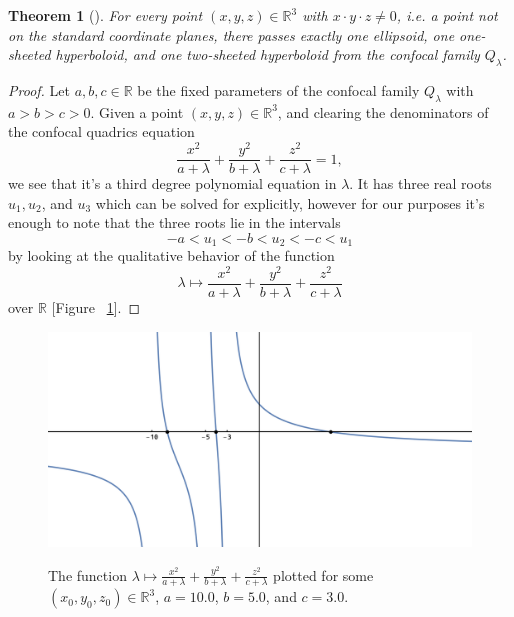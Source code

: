 \documentclass[12pt,a4paper]{article}
\theoremstyle{BoldTopSpacing}
\newtheorem{theorem}{Theorem}[section]
\theoremstyle{BoldTopSpacing}
\theoremstyle{BoldTopSpacing}
\theoremstyle{BoldTopBottomSpacing}
\theoremstyle{BoldTopSpacing}
\theoremstyle{BoldTopBottomSpacing}
\theoremstyle{remark}
\begin{document}
\begin{theorem}[]
\label{thm:fill-up-euclidean-space}
For every point $(x, y, z) \in \mathbb{R}^3$ with $x \cdot y \cdot z \neq 0$, i.e. a point not on the standard coordinate planes, there passes exactly one ellipsoid, one one-sheeted hyperboloid, and one two-sheeted hyperboloid from the confocal family $Q_{\lambda}$.
\end{theorem}

\begin{proof}
    Let $a, b, c \in \mathbb{R}$ be the fixed parameters of the confocal family $Q_{\lambda}$ with $a > b > c > 0$. Given a point $(x, y, z) \in \mathbb{R}^3$, and clearing the denominators of the confocal quadrics equation
\[
    \frac{x^2}{a + \lambda} + \frac{y^2}{b + \lambda} + \frac{z^2}{c + \lambda} = 1,
\]
we see that it's a third degree polynomial equation in $\lambda$. It has three real roots $u_{1}, u_{2}$, and $u_{3}$ which can be solved for explicitly, however for our purposes it's enough to note that the three roots lie in the intervals
\[
    -a < u_{1} < -b < u_{2} < -c < u_{1}
\]
by looking at the qualitative behavior of the function
\[
    \lambda \mapsto \frac{x^2}{a + \lambda} + \frac{y^2}{b + \lambda} + \frac{z^2}{c + \lambda}
\]
over $\mathbb{R}$ [Figure ~\ref{fig:plot}].
\end{proof}

\begin{figure}[H]
    \centering
    \includegraphics[width=1.0\textwidth]{graph-for-proof.png}
    \label{fig:graph-for-proof}
    \caption[A plot of the real-valued function $\lambda \mapsto \frac{x^2}{a + \lambda} + \frac{y^2}{b + \lambda} + \frac{z^2}{c + \lambda}$]{The function $\lambda \mapsto \frac{x^2}{a + \lambda} + \frac{y^2}{b + \lambda} + \frac{z^2}{c + \lambda}$ plotted for some $(x_0, y_0, z_0) \in \mathbb{R}^3$, $a = 10.0$, $b = 5.0$, and $c = 3.0$.}
    \label{fig:plot}
\end{figure}
\end{document}
